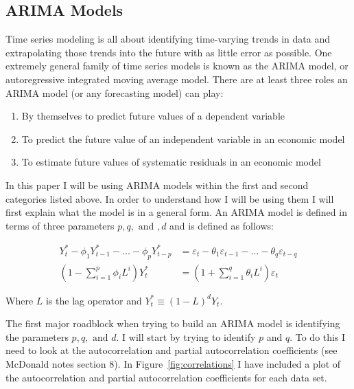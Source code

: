 \documentclass[a4paper, 11pt]{article}
\newcommand\ve{\varepsilon} %
\theoremstyle{definition} %
\numberwithin{equation}{section}
\begin{document}
  \subsection{ARIMA Models} \label{sub:arima}

    Time series modeling is all about identifying time-varying trends in data and extrapolating those trends into the future with as little error as possible. One extremely general family of time series models is known as the ARIMA model, or autoregressive integrated moving average model. There are at least three roles an ARIMA model (or any forecasting model) can play:

    \begin{enumerate}
      \item By themselves to predict future values of a dependent variable
      \item To predict the future value of an independent variable in an economic model
      \item To estimate future values of systematic residuals in an economic model
    \end{enumerate}

    In this paper I will be using ARIMA models within the first and second categories listed above. In order to understand how I will be using them I will first explain what the model is in a general form. An ARIMA model is defined in terms of three parameters $p, q, \text{ and }, d$ and is defined as follows:

     \begin{align}
     Y_t^* - \phi_1Y_{t-1}^*  - \dots - \phi_pY_{t-p}^* &= \ve_t - \theta_1\ve_{t-1} - \dots - \theta_q \ve_{t-q} \label{eq:arimalong}\\
     \left( 1 - \sum_{i=1}^p \phi_i L^i\right) Y_t^* &= \left( 1 + \sum_{i=1} ^q \theta_i L^i \right) \ve_t \label{eq:arima}
     \end{align}

    Where $L$ is the lag operator and $Y_t^* \equiv (1 - L)^d Y_t$.

    The first major roadblock when trying to build an ARIMA model is identifying the parameters $p, q, \text{ and } d$. I will start by trying to identify $p$ and $q$. To do this I need to look at the autocorrelation and partial autocorrelation coefficients (see McDonald notes section 8). In Figure~\ref{fig:correlations} I have included a plot of the autocorrelation and partial autocorrelation coefficients for each data set.
\end{document}
